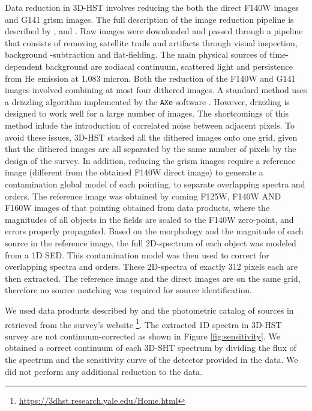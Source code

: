 \documentclass[manuscript]{aastex63}
\begin{document}
Data reduction in 3D-HST involves reducing the both the direct F140W images and G141 grism images. The full description of the image reduction pipeline is described by \cite{Brammer2012}, \cite{Skelton2014}  and \cite{Momcheva2016}. Raw images were downloaded and passed through a pipeline that consists of removing satellite trails and artifacts through visual inspection, background -subtraction and flat-fielding. The main physical sources of time-dependent background are zodiacal continuum, scattered light and persistence from He emission at 1.083 micron. Both the reduction of the F140W and G141 images involved combining at most four dithered images. A standard method uses a drizzling algorithm implemented by the \texttt{AXe} software \citep{Kuntschner2013, Kummel2009}. However, drizzling is designed to work well for a large number of images. The shortcomings of this method inlude the introduction of correlated noise between adjacent pixels. To avoid these issues, 3D-HST stacked all the dithered images onto one grid, given that the dithered images are all separated by the same number of pixels by the design of the survey. In addition, reducing the grism images require a reference image (different from the obtained F140W direct image) to generate a contamination global model of each pointing, to separate overlapping spectra and orders. The reference image was obtained by coming F125W, F140W AND F160W images of that pointing obtained from \cite{Skelton2014} data products, where the magnitudes of all objects in the fields are scaled to the F140W zero-point, and errors properly propagated. Based on the morphology and the magnitude of each source in the reference image, the full 2D-spectrum of each object was modeled from a 1D SED. This contamination model was then used to correct for overlapping spectra and orders. These 2D-spectra of exactly 312 pixels each are then extracted. The reference image and the direct images are on the same grid, therefore no source matching was required for source identification.

We used data products described by \cite{Momcheva2016} and the photometric catalog of sources in \cite{Skelton2014} retrieved from the survey's website \footnote{\url{https://3dhst.research.yale.edu/Home.html}}. The extracted 1D spectra in 3D-HST survey are not continuum-corrected as shown in Figure \ref{fig:sensitivity}. We obtained a correct continuum of each 3D-SHT spectrum by dividing the flux of the spectrum and the sensitivity curve of the detector provided in the data. We did not perform any additional reduction to the data.
\end{document}
